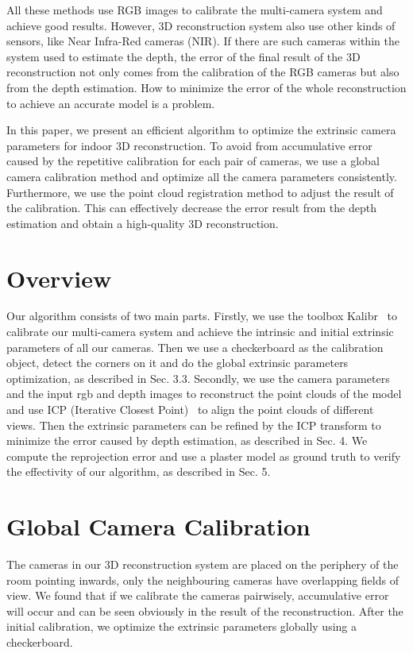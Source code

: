 \documentclass{article}
\begin{document}
All these methods use RGB images to calibrate the multi-camera system and achieve good results. However, 3D reconstruction system also use other kinds of sensors, like Near Infra-Red cameras (NIR). If there are such cameras within the system used to estimate the depth, the error of the final result of the 3D reconstruction not only comes from the calibration of the RGB cameras but also from the depth estimation. How to minimize the error of the whole reconstruction to achieve an accurate model is a problem.

In this paper, we present an efficient algorithm to optimize the extrinsic camera parameters for indoor 3D reconstruction. To avoid from accumulative error caused by the repetitive calibration for each pair of cameras, we use a global camera calibration method and optimize all the camera parameters consistently. Furthermore, we use the point cloud registration method to adjust the result of the calibration. This can effectively decrease the error result from the depth estimation and obtain a high-quality 3D reconstruction.



\section{Overview}
Our algorithm consists of two main parts. Firstly, we use the toolbox Kalibr~\cite{Maye2013Self} to calibrate our multi-camera system and achieve the intrinsic and initial extrinsic parameters of all our cameras. Then we use a checkerboard as the calibration object, detect the corners on it and do the global extrinsic parameters optimization, as described in Sec. 3.3. Secondly, we use the camera parameters and the input rgb and depth images to reconstruct the point clouds of the model and use ICP (Iterative Closest Point)~\cite{Besl1992A} to align the point clouds of different views. Then the extrinsic parameters can be refined by the ICP transform to minimize the error caused by depth estimation, as described in Sec. 4. We compute the reprojection error and use a plaster model as ground truth to verify the effectivity of our algorithm, as described in Sec. 5.


\section{Global Camera Calibration}
The cameras in our 3D reconstruction system are placed on the periphery of the room pointing inwards, only the neighbouring cameras have overlapping fields of view. We found that if we calibrate the cameras pairwisely, accumulative error will occur and can be seen obviously in the result of the reconstruction. After the initial calibration, we optimize the extrinsic parameters globally using a checkerboard.
\end{document}
